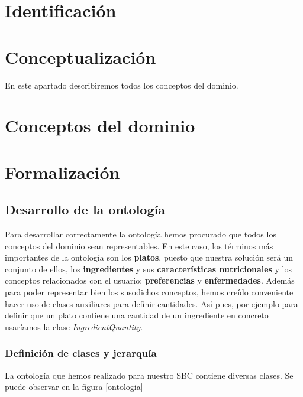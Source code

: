 \documentclass[12]{article}
\begin{document}
\section{Identificación}

\section{Conceptualización}
En este apartado describiremos todos los conceptos del dominio.

\section{Conceptos del dominio}

\section{Formalización}

\subsection{Desarrollo de la ontología}
Para desarrollar correctamente la ontología hemos procurado que todos los conceptos del dominio sean representables. En este caso, los términos más importantes de la ontología son los \textbf{platos}, puesto que nuestra solución será un conjunto de ellos, los \textbf{ingredientes} y sus \textbf{características nutricionales} y los conceptos relacionados con el usuario: \textbf{preferencias} y \textbf{enfermedades}. Además para poder representar bien los susodichos conceptos, hemos creído conveniente hacer uso de clases auxiliares para definir cantidades. Así pues, por ejemplo para definir que un plato contiene una cantidad de un ingrediente en concreto usaríamos la clase \textit{IngredientQuantity}.

\subsubsection{Definición de clases y jerarquía}

La ontología que hemos realizado para nuestro SBC contiene diversas clases. Se puede observar en la figura \ref{ontologia}

\end{document}
